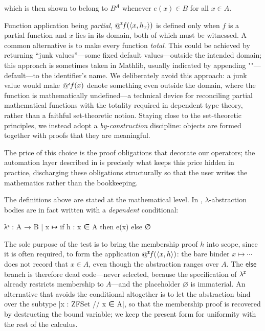 which is then shown to belong to $B^A$ whenever $e(x)\in B$ for all $x\in A$.

Function application being \emph{partial}, $\fapply{f}{\langle x, h_x \rangle}$ is defined only when $f$ is a partial function and $x$ lies in its domain, both of which must be witnessed.
A common alternative is to make every function \emph{total}.
This could be achieved by returning ``junk values''---some fixed default values---outside the intended domain; this approach is sometimes taken in Mathlib, usually indicated by appending ""---default---to the identifier's name.
We deliberately avoid this approach: a junk value would make $\fapply{f}{x}$ denote something even outside the domain, where the function is mathematically undefined---a technical device for reconciling partial mathematical functions with the totality required in dependent type theory, rather than a faithful set-theoretic notion.
Staying close to the set-theoretic principles, we instead adopt a \emph{by-construction} discipline: objects are formed together with proofs that they are meaningful.

\begin{remark}
  \label{rmk:no-junk}
  The price of this choice is the proof obligations that decorate our operators; the automation layer described in  is precisely what keeps this price hidden in practice, discharging these obligations structurally so that the user writes the mathematics rather than the bookkeeping.
\end{remark}

The definitions above are stated at the mathematical level.
In \zflean, $\lambda$-abstraction bodies are in fact written with a \emph{dependent} conditional:
\begin{leanlisting}
λᶻ : A → B
   | x ↦ if h : x ∈ A then e(x) else ∅
\end{leanlisting}
The sole purpose of the test  is to bring the membership proof $h$ into scope, since it is often required, \eg to form the application $\fapply{f}{\langle x, h \rangle}$: the bare binder $x \mapsto \cdots$ does not record that $x\in A$, even though the abstraction ranges over $A$.
The $\mathsf{else}$ branch is therefore dead code---never selected, because the specification of $\lambda^{\scriptscriptstyle{\mathsf{Z}}}$ already restricts membership to $A$---and the placeholder $\varnothing$ is immaterial.
An alternative that avoids the conditional altogether is to let the abstraction bind over the subtype \leaninl|{x : ZFSet // x ∈ A}|, so that the membership proof is recovered by destructing the bound variable; we keep the present form for uniformity with the rest of the calculus.
  
